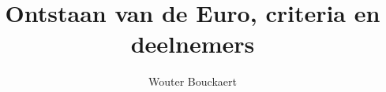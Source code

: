 \documentclass[a4paper, 12pt, titlepage]{report}
\begin{document}
\title{Ontstaan van de Euro, criteria en deelnemers}
\author{Wouter Bouckaert}
\maketitle
\tableofcontents



\end{document}
